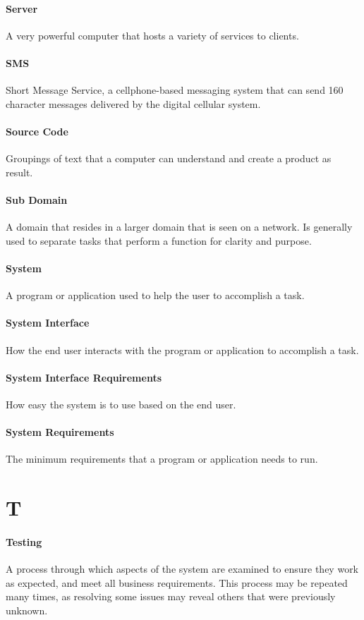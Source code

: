 \documentclass[letterpaper,12pt]{report}
\begin{document}
\paragraph{Server} A very powerful computer that hosts a variety of services to clients.
\paragraph{SMS} Short Message Service, a cellphone-based messaging system that can send 160 character messages delivered by the digital cellular system.
\paragraph{Source Code} Groupings of text that a computer can understand and create a product as result.
\paragraph{Sub Domain} A domain that resides in a larger domain that is seen on a network. Is generally used to separate tasks that perform a function for clarity and purpose.
\paragraph{System} A program or application used to help the user to accomplish a task.
\paragraph{System Interface} How the end user interacts with the program or application to accomplish a task.
\paragraph{System Interface Requirements} How easy the system is to use based on the end user.
\paragraph{System Requirements} The minimum requirements that a program or application needs to run.
\section*{T}
\paragraph{Testing} A process through which aspects of the system are examined to ensure they work as expected, and meet all business requirements. This process may be repeated many times, as resolving some issues may reveal others that were previously unknown.
\end{document}
